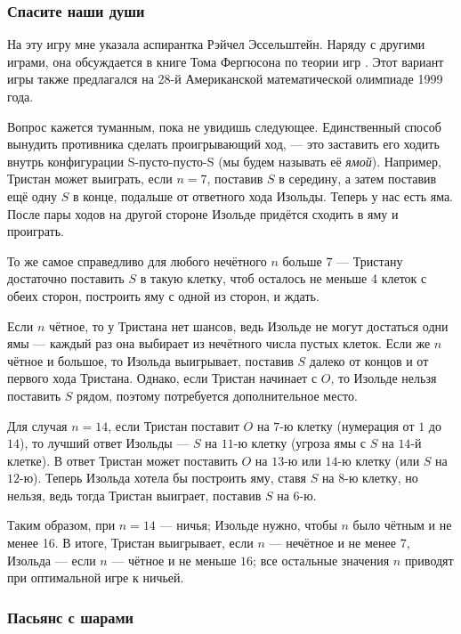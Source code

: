 \subsubsection*{Спасите наши души}

На эту игру мне указала аспирантка Рэйчел Эссельштейн.
Наряду с другими играми, она обсуждается в книге Тома Фергюсона по теории игр \cite{ferguson}.
Этот вариант игры также предлагался на 28-й Американской математической олимпиаде 1999 года.

Вопрос кажется туманным, пока не увидишь следующее.
Единственный способ вынудить противника сделать проигрывающий ход, --- это заставить его ходить внутрь конфигурации S-пусто-пусто-S (мы будем называть её \emph{ямой}).
Например, Тристан может выиграть, если $n = 7$, поставив $S$ в середину, а затем поставив ещё одну $S$ в конце, подальше от ответного хода Изольды.
Теперь у нас есть яма.
После пары ходов на другой стороне Изольде придётся сходить в яму и проиграть.

То же самое справедливо для любого нечётного $n$ больше $7$ --- Тристану достаточно поставить $S$ в такую клетку, чтоб осталось не меньше 4 клеток с обеих сторон, построить яму с одной из сторон, и ждать.

Если $n$ чётное, то у Тристана нет шансов, ведь Изольде не могут достаться одни ямы --- каждый раз она выбирает из нечётного числа пустых клеток.
Если же $n$ чётное и большое, то Изольда выигрывает, поставив $S$ далеко от концов и от первого хода Тристана.
Однако, если Тристан начинает с $O$, то Изольде нельзя поставить $S$ рядом, поэтому потребуется дополнительное место.

Для случая $n = 14$, если Тристан поставит $O$ на $7$-ю клетку (нумерация от $1$ до $14$), то лучший ответ Изольды --- $S$ на $11$-ю клетку (угроза ямы с $S$ на $14$-й клетке).
В ответ Тристан может поставить $O$ на $13$-ю или $14$-ю клетку (или $S$ на $12$-ю). 
Теперь Изольда хотела бы построить яму, ставя $S$ на $8$-ю клетку, но нельзя, ведь тогда Тристан выиграет, поставив $S$ на $6$-ю.

Таким образом, при $n = 14$ --- ничья;
Изольде нужно, чтобы $n$ было чётным и не менее 16.
В итоге, Тристан выигрывает, если $n$ --- нечётное и не менее $7$,
Изольда --- если $n$ --- чётное и не меньше $16$;
все остальные значения $n$ приводят при оптимальной игре к ничьей.

\subsubsection*{Пасьянс с шарами}

